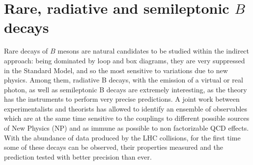 \section{Rare, radiative and semileptonic $B$ decays}


Rare decays of $B$ mesons are natural candidates to be studied within the indirect approach: being dominated by  loop and box diagrams, they are very suppressed in the Standard Model, and so the most sensitive to variations due to new physics.  
Among them, radiative B decays, with the emission of a virtual or real photon, as well as semileptonic B decays are extremely interesting, as the theory has the instruments to perform very precise predictions.  A joint work between experimentalists and theorists has allowed to identify an ensemble of observables which are
at the same time sensitive to the couplings to different possible sources of New Physics (NP) and as immune as possible to non factorizable QCD effects. 
With the abundance of data produced by the LHC collisions, for the first time some of these decays can be observed, their properties measured  and the prediction tested with better precision than ever. 

